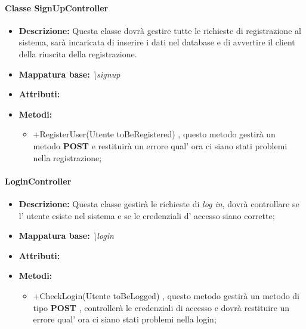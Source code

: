 \paragraph{Classe SignUpController}%
\begin{itemize}
	\item \textbf{Descrizione: } Questa classe dovrà gestire tutte le richieste di registrazione al sistema, sarà incaricata di inserire i dati nel database e di avvertire il client della riuscita della registrazione.
	\item \textbf{Mappatura base: }\textit{\textbackslash signup}
	\item \textbf{Attributi: }
	\item \textbf{Metodi: }\begin{itemize}
					\item +RegisterUser(Utente toBeRegistered) , questo metodo gestirà un metodo \textbf{POST} e restituirà un errore qual' ora ci siano stati problemi nella registrazione;
				\end{itemize}
\end{itemize}
\paragraph{LoginController}%
\begin{itemize}
	\item \textbf{Descrizione: }Questa classe gestirà le richieste di \textit{log in}, dovrà controllare se l' utente esiste nel sistema e se le credenziali d' accesso siano corrette;
	\item \textbf{Mappatura base: }\textit{\textbackslash login}
	\item \textbf{Attributi: }
	\item \textbf{Metodi: }\begin{itemize}
					\item +CheckLogin(Utente toBeLogged) , questo metodo gestirà un metodo di tipo \textbf{POST} , controllerà le credenziali di accesso e dovrà restituire un errore qual' ora ci siano stati problemi nella login;
				\end{itemize}
\end{itemize}
